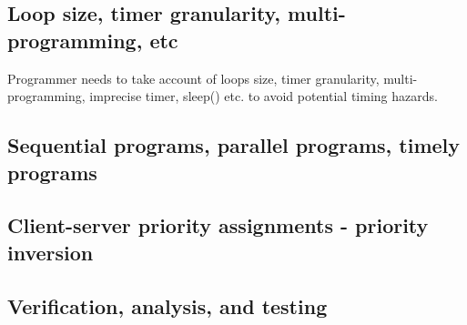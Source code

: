\subsection{Loop size, timer granularity, multi-programming, etc}
Programmer needs to take account of loops size, timer granularity, multi-programming, imprecise timer, sleep() etc. to avoid potential timing hazards.

\subsection{Sequential programs, parallel programs, timely programs}

\subsection{Client-server priority assignments - priority inversion}

\subsection{Verification, analysis, and testing}
